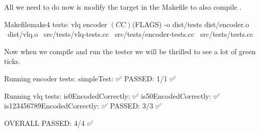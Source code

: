 All we need to do now is modify the  target in the Makefile to also compile .

\begin{file}{Makefile}{make}{4}
tests: vlq encoder
	$(CC) $(FLAGS) -o dist/tests dist/encoder.o \
	                             dist/vlq.o \
	                             src/tests/vlq-tests.cc \
	                             src/tests/encoder-tests.cc \
	                             src/tests/tests.cc
\end{file}

Now when we compile and run the tester we will be thrilled to see a lot of green ticks.

\begin{stdout}
Running encoder tests:
  simpleTest: ✅
PASSED: 1/1 ✅

Running vlq tests:
  is0EncodedCorrectly: ✅
  is50EncodedCorrectly: ✅
  is123456789EncodedCorrectly: ✅
PASSED: 3/3 ✅

OVERALL PASSED: 4/4 ✅
\end{stdout}